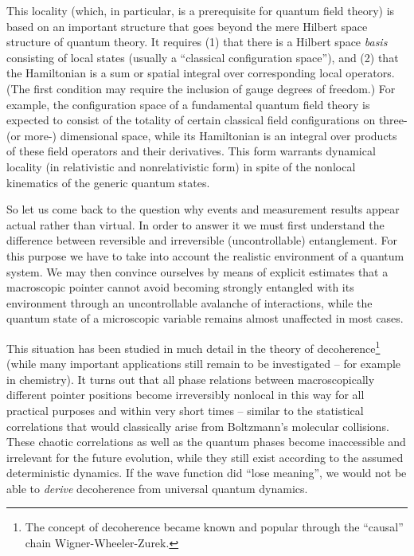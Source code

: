 \documentclass[12pt]{article}
\begin{document}
This locality (which, in particular, is a prerequisite for quantum
field theory) is based on an important structure that goes beyond the
mere Hilbert space structure of quantum theory. It requires (1) that
there is a Hilbert space {\it basis} consisting of local states
(usually a ``classical configuration space''), and (2) that the
Hamiltonian is a sum or spatial integral over corresponding local
operators. (The first condition may require the inclusion of gauge
degrees of freedom.) For example, the configuration space of a
fundamental quantum field theory is expected to consist of the
totality of certain classical field configurations on three- (or
more-) dimensional space, while its Hamiltonian is an integral over
products of these field operators and their derivatives. This form
warrants dynamical locality (in relativistic and nonrelativistic form)
in spite of the nonlocal kinematics of the generic quantum states.

So let us come back to the question why events and measurement results
appear actual rather than virtual. In order to answer it we
must first understand the difference between reversible and
irreversible (uncontrollable) entanglement. For this purpose we have
to take into account the realistic environment of a quantum system.
We may then convince ourselves by means of explicit estimates that a
macroscopic pointer cannot avoid becoming strongly entangled with its
environment through an uncontrollable avalanche of interactions, while
the quantum state of a microscopic variable remains almost
unaffected in most cases.

This situation has been
studied in much detail in the theory of decoher\-ence\footnote{The
concept of decoherence became known and popular through the ``causal''
chain Wigner-Wheeler-Zurek.} \cite{Giulini,
Zurek2001} (while many important applications still  remain to be
investigated -- for example in chemistry).  It turns out that all phase
relations between macroscopically different pointer positions become
irreversibly nonlocal in this way for all practical purposes and within
very short times -- similar to the statistical correlations that would
classically arise from Boltzmann's molecular collisions.
These chaotic correlations as well as the quantum
phases become inaccessible and irrelevant for the future evolution,
while they still exist according to the assumed deterministic
dynamics. If the wave function did ``lose meaning'', we would not
be able to {\it derive} decoherence from universal quantum dynamics.
 
\end{document}
